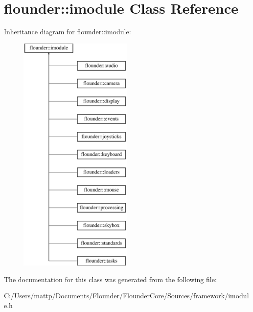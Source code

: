 \hypertarget{classflounder_1_1imodule}{}\section{flounder\+:\+:imodule Class Reference}
\label{classflounder_1_1imodule}
Inheritance diagram for flounder\+:\+:imodule\+:\begin{figure}[H]
\begin{center}
\leavevmode
\includegraphics[height=12.000000cm]{classflounder_1_1imodule}
\end{center}
\end{figure}


The documentation for this class was generated from the following file\+:\begin{DoxyCompactItemize}
\item 
C\+:/\+Users/mattp/\+Documents/\+Flounder/\+Flounder\+Core/\+Sources/framework/imodule.\+h\end{DoxyCompactItemize}
